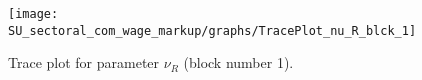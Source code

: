 \begin{figure}[H]
\centering
  \texttt{[image: SU\_sectoral\_com\_wage\_markup/graphs/TracePlot\_nu\_R\_blck\_1]}\\
    \caption{Trace plot for parameter ${\nu_R}$ (block number 1).}
\end{figure}
